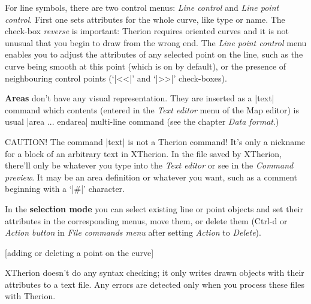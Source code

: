 For line symbols, there are two control menus: {\it Line control} and {\it Line 
point control}. First one sets attributes for the whole curve, like type or
name. The check-box {\it reverse} is important: Therion requires oriented 
curves and it is not unusual that you begin to draw from the wrong end.
The {\it Line point control} menu enables you to adjust the attributes of any selected 
point on the line, such as the curve being smooth at this point (which is on 
by default), or the presence of neighbouring control points (`|<<|' and `|>>|' 
check-boxes).

{\bf Areas} don't have any visual representation. They are inserted as a |text| 
command which contents (entered in the {\it Text editor} menu of the Map editor) 
is usual |area ... endarea| multi-line command (see the chapter {\it Data 
format}.) 

CAUTION! The command |text| is not a Therion command! It's only a nickname for a 
block of an arbitrary text in 
XTherion. In the file saved by XTherion, there'll only be 
whatever you type into the {\it Text editor} or see in the {\it Command preview}.
It may be an area definition or whatever you want, such as a comment beginning 
with a `|#|' character.

In the {\bf selection mode} you can select existing line or point objects and  
set their attributes in the corresponding menus, move them, or delete them (Ctrl-d or 
{\it Action button} in {\it File commands menu} after setting {\it Action} to 
{\it Delete}).

[adding or deleting a point on the curve]

XTherion doesn't do any syntax checking; it only writes drawn objects with their 
attributes to a text file. Any errors are detected only when you process these 
files with Therion.


\endinput
